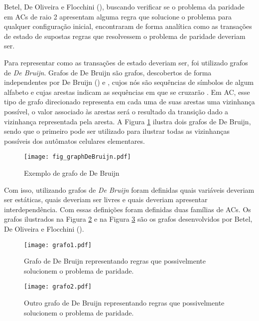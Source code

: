 Betel, De Oliveira e Flocchini (\citeyear{Betel2013}), buscando verificar se o problema da paridade em ACs de raio 2 apresentam alguma regra que solucione o problema para qualquer configuração inicial, encontraram de forma analítica como as transações de estado de supostas regras que resolvessem o problema de paridade deveriam ser. 

Para representar como as transações de estado deveriam ser, foi utilizado grafos de \textit{De Bruijn}. Grafos de De Bruijn são grafos, descobertos de forma independentes por De Bruijn (\citeyear{Bruijn946combinatorial}) e , cujos nós são sequências de símbolos de algum alfabeto e cujas arestas indicam as sequências em que se cruzarão \cite{weisstein2015deBruijn}. Em AC, esse tipo de grafo direcionado representa em cada uma de suas arestas uma vizinhança possível, o valor associado às arestas será o resultado da transição dado a vizinhança representada pela aresta. A Figura \ref{fig:grafosDeBruijnSample} ilustra dois grafos de De Bruijn, sendo que o primeiro pode ser utilizado para ilustrar todas as vizinhanças possíveis dos autômatos celulares elementares.

\begin{figure}[h!]
\centering
\texttt{[image: fig\_graphDeBruijn.pdf]}
\caption{Exemplo de grafo de De Bruijn \cite{Good1946normal}}
\label{fig:grafosDeBruijnSample}
\end{figure}

Com isso, utilizando grafos de \textit{De Bruijn} foram definidas quais variáveis deveriam ser estáticas, quais deveriam ser livres e quais deveriam apresentar interdependência. Com essas definições foram definidas duas famílias de ACs. Os grafos ilustrados na Figura \ref{fig:grafosDeBruijn} e na Figura \ref{fig:grafosDeBruijn2} são os grafos desenvolvidos por Betel, De Oliveira e Flocchini (\citeyear{Betel2013}).

\begin{figure}[h!]
\centering
\texttt{[image: grafo1.pdf]}
\caption{Grafo de De Bruijn representando regras que possivelmente solucionem o problema de paridade. \cite{Betel2013}}
\label{fig:grafosDeBruijn}
\end{figure}

\begin{figure}[h!]
\centering
\texttt{[image: grafo2.pdf]}
\caption{Outro grafo de De Bruijn representando regras que possivelmente solucionem o problema de paridade.\cite{Betel2013}}
\label{fig:grafosDeBruijn2}
\end{figure}

